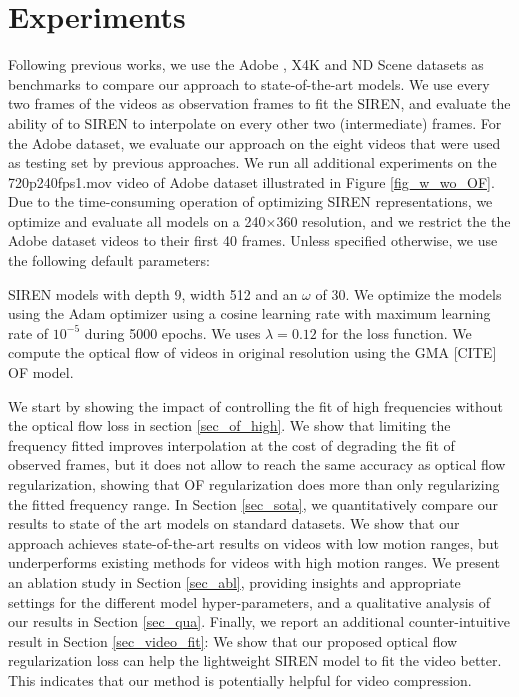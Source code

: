 \documentclass{article}
\begin{document}
\section{Experiments}

Following previous works, we use the Adobe\cite{su2017deep} , X4K\cite{sim2021xvfi} and ND Scene\cite{yoon2020novel} 
datasets as benchmarks to compare our approach to state-of-the-art models.
We use every two frames of the videos as observation frames to fit the SIREN,
and evaluate the ability of to SIREN to interpolate on every other two (intermediate) frames.
For the Adobe dataset, we evaluate our approach on the eight videos that were used as testing set by previous approaches.
We run all additional experiments on the 720p240fps1.mov video of Adobe dataset illustrated in Figure \ref{fig_w_wo_OF}.
Due to the time-consuming operation of optimizing SIREN representations,
we optimize and evaluate all models on a 240$\times$360 resolution,
and we restrict the the Adobe dataset videos to their first 40 frames.
Unless specified otherwise, we use the following default parameters:

SIREN models with depth 9, width 512 and an $\omega$ of 30.
We optimize the models using the Adam optimizer using a cosine learning rate with maximum learning rate of $10^{-5}$ during 5000 epochs.
We uses $\lambda = 0.12$ for the loss function. We compute the optical flow of videos in original resolution using the GMA [CITE] OF model.

We start by showing the impact of controlling the fit of high frequencies without the optical flow loss in section \ref{sec_of_high}.
We show that limiting the frequency fitted improves interpolation at the cost of degrading the fit of observed frames,
but it does not allow to reach the same accuracy as optical flow regularization,
showing that OF regularization does more than only regularizing the fitted frequency range.
In Section \ref{sec_sota}, we quantitatively compare our results to state of the art models on standard datasets.
We show that our approach achieves state-of-the-art results on videos with low motion ranges,
but underperforms existing methods for videos with high motion ranges.
We present an ablation study in Section \ref{sec_abl},
providing insights and appropriate settings for the different model hyper-parameters,
and a qualitative analysis of our results in Section \ref{sec_qua}.
Finally, we report an additional counter-intuitive result in Section \ref{sec_video_fit}:
We show that our proposed optical flow regularization loss can help the lightweight SIREN model to fit the video better.
This indicates that our method is potentially helpful for video compression.
\end{document}
